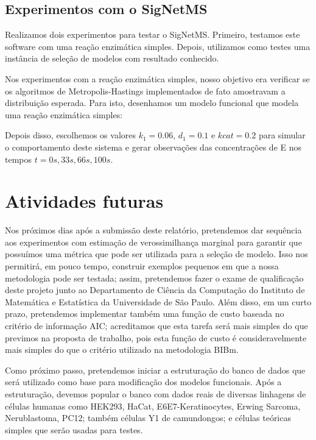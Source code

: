 \documentclass[12pt]{article}
\begin{document}
\subsection{Experimentos com o SigNetMS}\label{experimentos}
Realizamos dois experimentos para testar o SigNetMS. Primeiro, testamos
este software com uma reação enzimática simples. Depois, utilizamos como
testes uma instância de seleção de modelos com resultado conhecido.

Nos experimentos com a reação enzimática simples, nosso objetivo era
verificar se os algoritmos de Metropolis-Hastings implementados de fato
amostravam a distribuição esperada. Para isto, desenhamos um modelo 
funcional que modela uma reação enzimática simples:
\begin{center}
\end{center}
Depois disso, escolhemos os valores $k_1 = 0.06$, $d_1 = 0.1$ e 
$kcat = 0.2$ para simular o comportamento deste sistema e gerar 
observações das concentrações de E nos tempos $t = 0s, 33s, 66s, 100s$.



\section{Atividades futuras}
Nos próximos dias após a submissão deste relatório, pretendemos dar 
sequência aos experimentos com estimação de verossimilhança marginal 
para garantir que possuímos uma métrica que pode ser utilizada para a
seleção de modelo. Isso nos permitirá, em pouco tempo, construir 
exemplos pequenos em que a nossa metodologia pode ser testada; assim,
pretendemos fazer o exame de qualificação deste projeto junto ao 
Departamento de Ciência da Computação do Instituto de Matemática e 
Estatística da Universidade de São Paulo. Além disso, em um curto prazo,
pretendemos implementar também uma função de custo baseada no critério
de informação AIC; acreditamos que esta tarefa será mais simples do que
previmos na proposta de trabalho, pois esta função de custo é 
consideravelmente mais simples do que o critério utilizado na 
metodologia BIBm.

Como próximo passo, pretendemos iniciar a estruturação do banco de dados 
que será utilizado como base para modificação dos modelos funcionais. 
Após a estruturação, devemos popular o banco com dados reais de diversas 
linhagens de células humanas como HEK293, HaCat, E6E7-Keratinocytes,
Erwing Sarcoma, Nerublastoma, PC12; também células Y1 de camundongos; e
células teóricas simples que serão usadas para testes.
\end{document}
